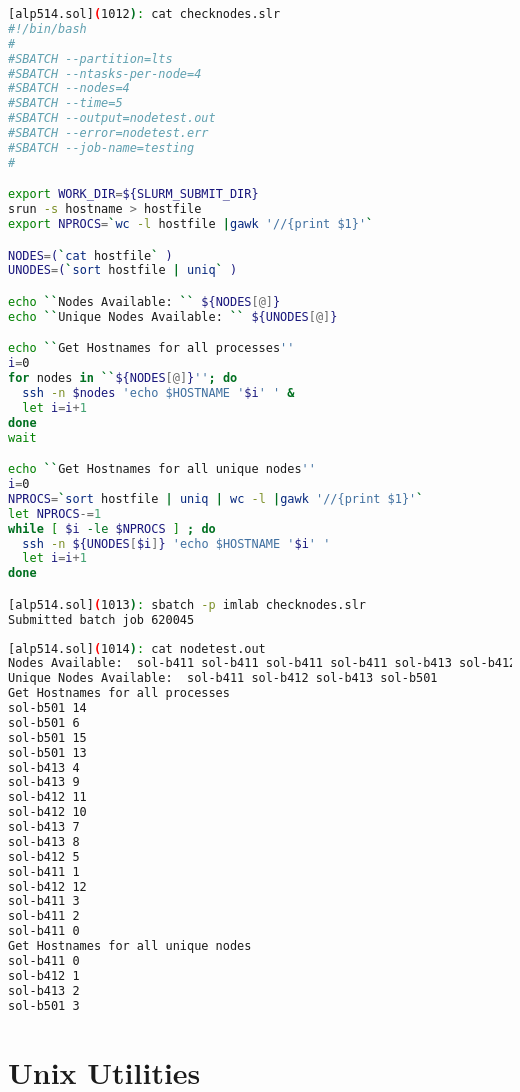 \documentclass[10pt,t]{beamer}
\begin{document}
\begin{frame}[fragile]
  \begin{lstlisting}[language=bash]
[alp514.sol](1012): cat checknodes.slr
#!/bin/bash
#
#SBATCH --partition=lts
#SBATCH --ntasks-per-node=4
#SBATCH --nodes=4
#SBATCH --time=5
#SBATCH --output=nodetest.out
#SBATCH --error=nodetest.err
#SBATCH --job-name=testing
#

export WORK_DIR=${SLURM_SUBMIT_DIR}
srun -s hostname > hostfile
export NPROCS=`wc -l hostfile |gawk '//{print $1}'`

NODES=(`cat hostfile` )
UNODES=(`sort hostfile | uniq` )

echo ``Nodes Available: `` ${NODES[@]}
echo ``Unique Nodes Available: `` ${UNODES[@]}

echo ``Get Hostnames for all processes''
i=0
for nodes in ``${NODES[@]}''; do
  ssh -n $nodes 'echo $HOSTNAME '$i' ' &
  let i=i+1
done
wait

echo ``Get Hostnames for all unique nodes''
i=0
NPROCS=`sort hostfile | uniq | wc -l |gawk '//{print $1}'`
let NPROCS-=1
while [ $i -le $NPROCS ] ; do
  ssh -n ${UNODES[$i]} 'echo $HOSTNAME '$i' '
  let i=i+1
done

[alp514.sol](1013): sbatch -p imlab checknodes.slr
Submitted batch job 620045
  \end{lstlisting}
\end{frame}

\begin{frame}
  \begin{lstlisting}[language=bash,deletekeywords={cat,for}]
[alp514.sol](1014): cat nodetest.out
Nodes Available:  sol-b411 sol-b411 sol-b411 sol-b411 sol-b413 sol-b412 sol-b501 sol-b413 sol-b413 sol-b413 sol-b412 sol-b412 sol-b412 sol-b501 sol-b501 sol-b501
Unique Nodes Available:  sol-b411 sol-b412 sol-b413 sol-b501
Get Hostnames for all processes
sol-b501 14
sol-b501 6
sol-b501 15
sol-b501 13
sol-b413 4
sol-b413 9
sol-b412 11
sol-b412 10
sol-b413 7
sol-b413 8
sol-b412 5
sol-b411 1
sol-b412 12
sol-b411 3
sol-b411 2
sol-b411 0
Get Hostnames for all unique nodes
sol-b411 0
sol-b412 1
sol-b413 2
sol-b501 3
  \end{lstlisting}
\end{frame}

\section{Unix Utilities}
\end{document}
